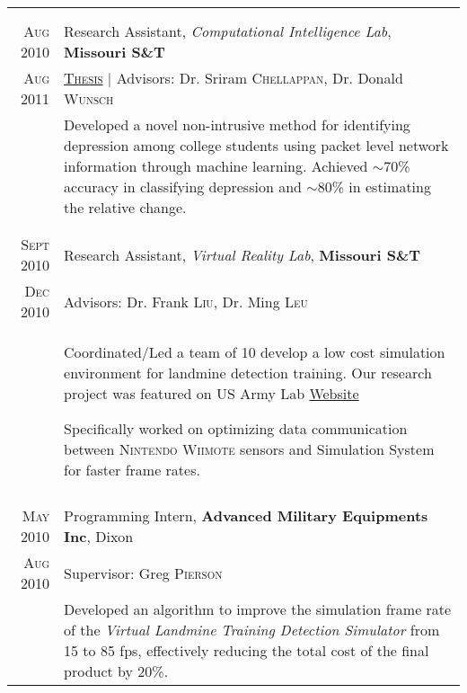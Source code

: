 \documentclass[a4paper,11pt]{article}
\begin{document}
\begin{longtable}{r|p{12.5cm}}
{\begin{minipage}[t]{12.5cm}
 \end{minipage}}
 \\
 \multicolumn{2}{c}{}
 \\
 \textsc{Aug 2010} & Research Assistant, \emph{Computational Intelligence Lab}, \normalsize \textbf{Missouri S\&T} \\
 \textsc{Aug 2011} & \textsc{\href{https://github.com/raghakot/papers/blob/master/thesis.pdf}{Thesis}} | \small Advisors: Dr. Sriram \textsc{Chellappan}, Dr. Donald \textsc{Wunsch} \\
 & \footnotesize{ \begin{minipage}[t]{12.5cm} Developed a novel non-intrusive method for identifying depression among college students using packet level network information through machine learning. Achieved $\sim$70\% accuracy in classifying depression and $\sim$80\% in estimating the relative change.
 \end{minipage}}
 \\
 \multicolumn{2}{c}{}
 \\
 \\*
 \textsc{Sept 2010} & Research Assistant, \emph{Virtual Reality Lab}, \normalsize \textbf{Missouri S\&T} \\
 \textsc{Dec 2010} & \small Advisors: Dr. Frank \textsc{Liu}, Dr. Ming \textsc{Leu} \\
 & \footnotesize{ \begin{minipage}[t]{12.5cm} \begin{compactitem}
     \item Coordinated/Led a team of 10 develop a low cost simulation environment for landmine detection training. Our research project was featured on US Army Lab \href{http://www.arl.army.mil/www/default.cfm?page=640}{Website}
     \item Specifically worked on optimizing data communication between \textsc{Nintendo Wiimote} sensors and Simulation System for faster frame rates.
     \end{compactitem}
 \end{minipage}}
 \\
 \multicolumn{2}{c}{}
 \\
 \textsc{May 2010} & Programming Intern, \normalsize \textbf{Advanced Military Equipments Inc}, Dixon \\
 \textsc{Aug 2010} & \small Supervisor: Greg \textsc{Pierson} \\
 & \footnotesize{ \begin{minipage}[t]{12.5cm} Developed an algorithm to improve the simulation frame rate of the \emph{Virtual Landmine Training Detection Simulator} from 15 to 85 fps, effectively reducing the total cost of the final product by 20\%.

\end{minipage}}
\end{longtable}
\end{document}
